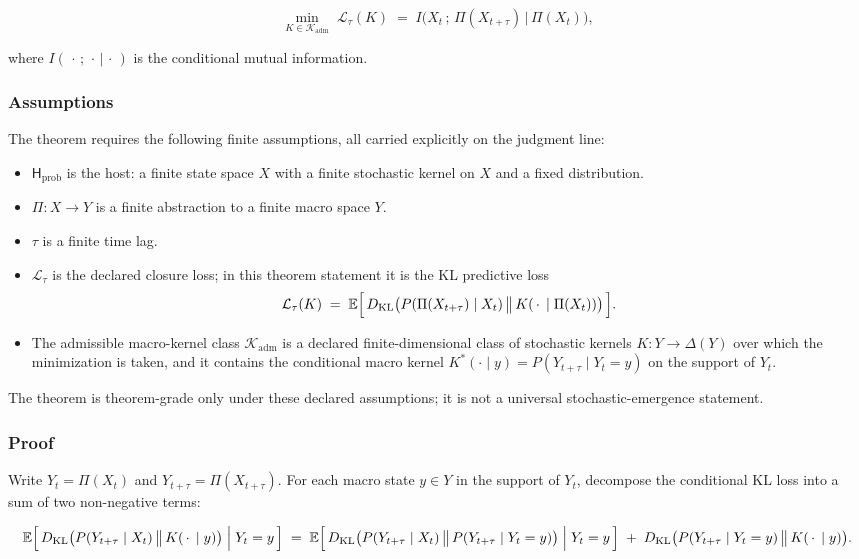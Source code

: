 \documentclass[11pt]{article}
\providecommand{\tightlist}{}
\theoremstyle{definition}
\begin{document}
\[
\min_{K\in\mathcal K_{\mathrm{adm}}}\;\mathcal L_\tau(K)\;=\;I\bigl(X_t\,;\,\Pi(X_{t+\tau})\,\big|\,\Pi(X_t)\bigr),
\]

where \(I(\,\cdot\,;\,\cdot\,|\,\cdot\,)\) is the conditional mutual information.

\subsubsection{Assumptions}

The theorem requires the following finite assumptions, all carried explicitly on the judgment line:

\begin{itemize}
\tightlist
\item
  \(\mathsf H_{\mathrm{prob}}\) is the host: a finite state space \(X\) with a finite stochastic kernel on \(X\) and a fixed distribution.
\item
  \(\Pi:X\to Y\) is a finite abstraction to a finite macro space \(Y\).
\item
  \(\tau\) is a finite time lag.
\item
  \(\mathcal L_\tau\) is the declared closure loss; in this theorem statement it is the KL predictive loss
  \[\mathcal L_\tau(K)\;=\;\mathbb E\Bigl[\,D_{\mathrm{KL}}\bigl(P(\Pi(X_{t+\tau})\mid X_t)\,\big\|\,K(\,\cdot\,\mid\Pi(X_t))\bigr)\,\Bigr].\]
\item
  The admissible macro-kernel class \(\mathcal K_{\mathrm{adm}}\) is a declared finite-dimensional class of stochastic kernels \(K:Y\to\Delta(Y)\) over which the minimization is taken, and it contains the conditional macro kernel \(K^\ast(\cdot\mid y)=P(Y_{t+\tau}\mid Y_t=y)\) on the support of \(Y_t\).
\end{itemize}

The theorem is theorem-grade only under these declared assumptions; it is not a universal stochastic-emergence statement.

\subsubsection{Proof}

Write \(Y_t=\Pi(X_t)\) and \(Y_{t+\tau}=\Pi(X_{t+\tau})\). For each macro state \(y\in Y\) in the support of \(Y_t\), decompose the conditional KL loss into a sum of two non-negative terms:

\[
\mathbb E\Bigl[\,D_{\mathrm{KL}}\bigl(P(Y_{t+\tau}\mid X_t)\,\big\|\,K(\,\cdot\,\mid y)\bigr)\;\Big|\;Y_t=y\,\Bigr]\;=\;\mathbb E\Bigl[\,D_{\mathrm{KL}}\bigl(P(Y_{t+\tau}\mid X_t)\,\big\|\,P(Y_{t+\tau}\mid Y_t=y)\bigr)\;\Big|\;Y_t=y\,\Bigr]\;+\;D_{\mathrm{KL}}\bigl(P(Y_{t+\tau}\mid Y_t=y)\,\big\|\,K(\,\cdot\,\mid y)\bigr).
\]
\end{document}
